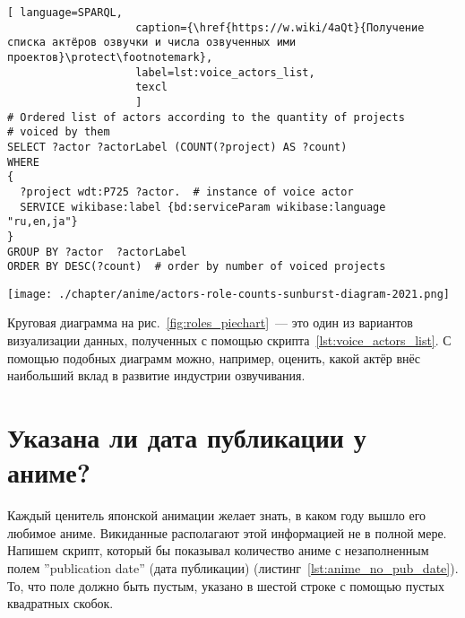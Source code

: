 \begin{lstlisting}[ language=SPARQL, 
                    caption={\href{https://w.wiki/4aQt}{Получение списка актёров озвучки и числа озвученных ими проектов}\protect\footnotemark},
                    label=lst:voice_actors_list,
                    texcl 
                    ]
# Ordered list of actors according to the quantity of projects
# voiced by them
SELECT ?actor ?actorLabel (COUNT(?project) AS ?count)
WHERE
{
  ?project wdt:P725 ?actor.	 # instance of voice actor
  SERVICE wikibase:label {bd:serviceParam wikibase:language "ru,en,ja"}
}
GROUP BY ?actor  ?actorLabel
ORDER BY DESC(?count)  # order by number of voiced projects
\end{lstlisting}%

\begin{figure*}[h]
	\texttt{[image: ./chapter/anime/actors-role-counts-sunburst-diagram-2021.png]}
	\caption[Круговая диаграмма числа ролей, озвученных различными сэйю, 2021 год.]{Диаграмма <<солнечные лучи>> числа ролей, озвученных различными актёрами, построенная в 2021 году с помощью сервиса Rawgraphs (\href{https://app.rawgraphs.io}{https://app.rawgraphs.io}).}%
      \label{fig:roles_piechart}%
\end{figure*}

Круговая диаграмма на рис.~\ref{fig:roles_piechart}~--- это один из вариантов визуализации данных, полученных с помощью скрипта~\ref{lst:voice_actors_list}. С помощью подобных диаграмм можно, например, оценить, какой актёр внёс наибольший вклад в развитие индустрии озвучивания.

\section{Указана ли дата публикации у аниме?}

Каждый ценитель японской анимации желает знать, в каком году вышло его любимое аниме. Викиданные располагают этой информацией не в полной мере. Напишем скрипт, который бы показывал количество аниме с незаполненным полем ''publication date'' (дата публикации) (листинг~\ref{lst:anime_no_pub_date}). То, что поле должно быть пустым, указано в шестой строке с помощью пустых квадратных скобок.

